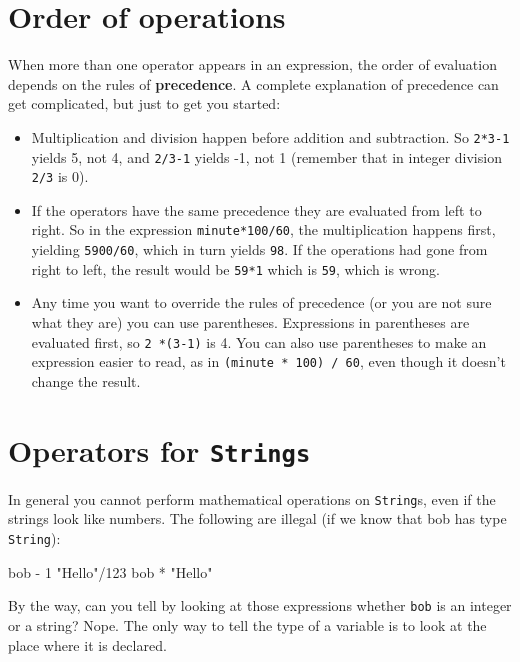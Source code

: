 \section{Order of operations}

When more than one operator appears in an expression, the order of evaluation depends on the rules of {\bf precedence}.
A complete explanation of precedence can get complicated, but just to get you started:

\begin{itemize}

\item Multiplication and division happen before addition and subtraction.
So {\tt 2*3-1} yields 5, not 4, and {\tt 2/3-1} yields -1, not 1 (remember that in integer division {\tt 2/3} is 0).

\item If the operators have the same precedence they are evaluated from left to right.
So in the expression {\tt minute*100/60}, the multiplication happens first, yielding {\tt 5900/60}, which in turn yields {\tt 98}.
If the operations had gone from right to left, the result would be {\tt 59*1} which is {\tt 59}, which is wrong.

\item Any time you want to override the rules of precedence (or you are not sure what they are) you can use parentheses.
Expressions in parentheses are evaluated first, so {\tt 2 *(3-1)} is 4.
You can also use parentheses to make an expression easier to read, as in {\tt(minute * 100) / 60}, even though it doesn't change the result.

\end{itemize}


\section{Operators for {\tt Strings}}


In general you cannot perform mathematical operations on {\tt String}s, even if the strings look like numbers.
The following are illegal (if we know that bob has type {\tt String}):

\begin{stdout}
bob - 1         "Hello"/123      bob * "Hello"
\end{stdout}

By the way, can you tell by looking at those expressions whether {\tt bob} is an integer or a string?
Nope.
The only way to tell the type of a variable is to look at the place where it is declared.

